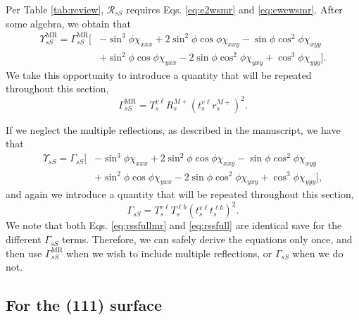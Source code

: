 Per Table \ref{tab:review}, $\mathcal{R}_{sS}$ requires Eqs. \eqref{eq:e2wsmr}
and \eqref{eq:ewewsmr}. After some algebra, we obtain that
\begin{equation}\label{eq:rssfullmr}
\begin{split}
\Upsilon^{\mathrm{MR}}_{sS} = 
\Gamma^{\mathrm{MR}}_{sS}
\big[
&- \sin^{3}\phi\chi_{xxx}
 + 2\sin^{2}\phi\cos\phi\chi_{xxy}
 - \sin\phi\cos^{2}\phi\chi_{xyy}\\
&+ \sin^{2}\phi\cos\phi\chi_{yxx}
 - 2\sin\phi\cos^{2}\phi\chi_{yxy}
 + \cos^{3}\phi\chi_{yyy}
\big].
\end{split}
\end{equation}
We take this opportunity to introduce a quantity that will be repeated
throughout this section,
\begin{equation}\label{eq:gammassmr}
\Gamma^{\mathrm{MR}}_{sS} =
T_{s}^{v\ell}R^{M+}_{s}\left(t^{v\ell}_{s}r^{M+}_{s}\right)^{2}.
\end{equation}

If we neglect the multiple reflections, as described in the manuscript, we have
that
\begin{equation}\label{eq:rssfull}
\begin{split}
\Upsilon_{sS} =
\Gamma_{sS}
\big[
&- \sin^{3}\phi\chi_{xxx}
 + 2\sin^{2}\phi\cos\phi\chi_{xxy}
 - \sin\phi\cos^{2}\phi\chi_{xyy}\\
&+ \sin^{2}\phi\cos\phi\chi_{yxx}
 - 2\sin\phi\cos^{2}\phi\chi_{yxy}
 + \cos^{3}\phi\chi_{yyy}
\big],
\end{split}
\end{equation}
and again we introduce a quantity that will be repeated throughout this section,
\begin{equation}\label{eq:gammass}
\Gamma_{sS} =
T^{v\ell}_{s}T^{\ell b}_{s}\left(t^{v\ell}_{s}t^{\ell b}_{s}\right)^{2}.
\end{equation}
We note that both Eqs. \eqref{eq:rssfullmr} and \eqref{eq:rssfull} are identical
save for the different $\Gamma_{sS}$ terms. Therefore, we can safely derive the
equations only once, and then use $\Gamma^{\mathrm{MR}}_{sS}$ when we wish to
include multiple reflections, or $\Gamma_{sS}$ when we do not.


\subsection{For the (111) surface}

